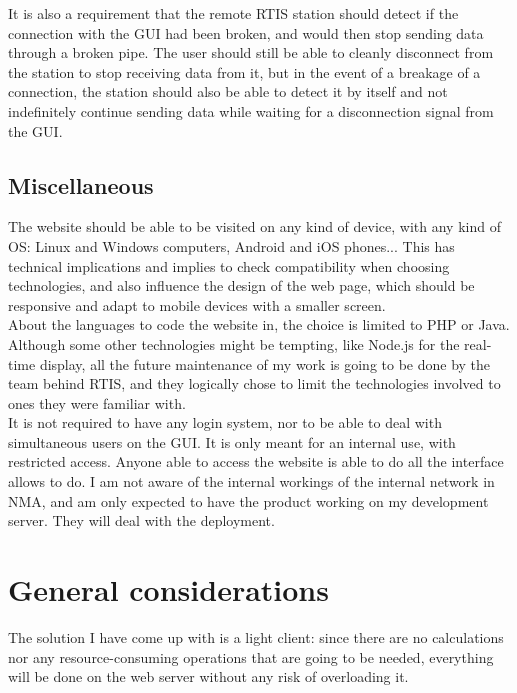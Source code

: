 \documentclass{themeensg}
\begin{document}
It is also a requirement that the remote RTIS station should detect if the connection with the GUI had been broken, and would then stop sending data through a broken pipe. The user should still be able to cleanly disconnect from the station to stop receiving data from it, but in the event of a breakage of a connection, the station should also be able to detect it by itself and not indefinitely continue sending data while waiting for a disconnection signal from the GUI.

\subsection{Miscellaneous}
The website should be able to be visited on any kind of device, with any kind of OS: Linux and Windows computers, Android and iOS phones... This has technical implications and implies to check compatibility when choosing technologies, and also influence the design of the web page, which should be responsive and adapt to mobile devices with a smaller screen.\\

About the languages to code the website in, the choice is limited to PHP or Java. Although some other  technologies might be tempting, like Node.js for the real-time display, all the future maintenance of my work is going to be done by the team behind RTIS, and they logically chose to limit the technologies involved to ones they were familiar with.\\

It is not required to have any login system, nor to be able to deal with simultaneous users on the GUI. It is only meant for an internal use, with restricted access. Anyone able to access the website is able to do all the interface allows to do. I am not aware of the internal workings of the internal network in NMA, and am only expected to have the product working on my development server. They will deal with the deployment.

\section{General considerations}

The solution I have come up with is a light client: since there are no calculations nor any resource-consuming operations that are going to be needed, everything will be done on the web server without any risk of overloading it.\\
\end{document}
